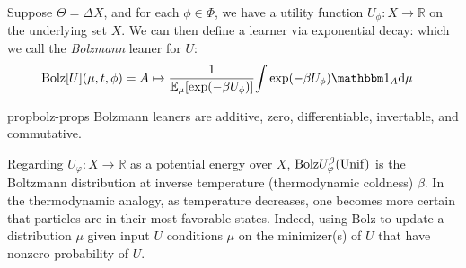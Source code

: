 \def\Bolz{\mathrm{Bolz}}

Suppose $\Theta = \Delta X$,
and for each $\phi \in \Phi$, we have a utility function $U_\phi : X \to \mathbb R$ on the underlying set $X$.
We can then define a learner via exponential decay:
which we call the \emph{Bolzmann} leaner for $U$:
\begin{align*}
	\Bolz[U](\mu, t, \phi)
		&= A \mapsto \frac
			1{\Ex_{\mu} [ \exp(-\beta U_\phi)]}
			{\int \exp(-\beta U_\phi) \mathbbm 1_A \mathrm d\mu }
\end{align*}

\begin{linked}{prop}{bolz-props}
	Bolzmann
	leaners
	are additive, zero, differentiable, invertable, and commutative.
\end{linked}




	Regarding $U_\varphi : X \to \mathbb R$
	as a potential energy over $X$,
	$\Bolz U^\beta_\varphi(\Unif)$ is the Boltzmann distribution at inverse temperature (thermodynamic coldness) $\beta$.
	In the thermodynamic analogy, as temperature decreases, one becomes more certain that particles are in their most favorable states.
	Indeed, using $\Bolz$ to update a distribution $\mu$ given
	input $U$ conditions $\mu$ on the minimizer(s) of $U$ that have
	nonzero probability of $U$.


